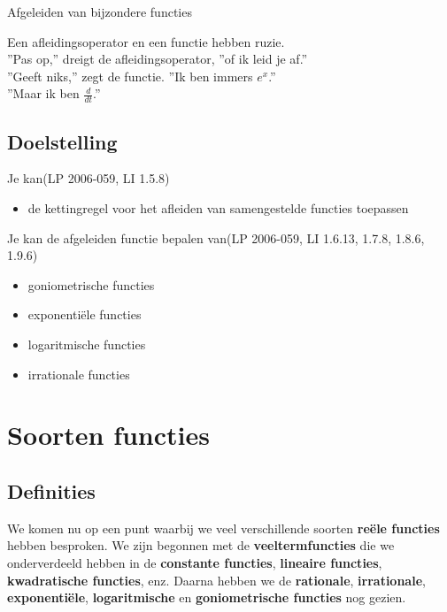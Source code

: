 \documentclass[12pt,twoside,a4paper]{article}
\begin{document}
\thispagestyle{empty}
\begin{center}
  \begin{mdframed}
  \centering
  \fontsize{40}{40}\selectfont Afgeleiden van bijzondere functies
  \end{mdframed}
  \vfill
  \begin{center}
    \begin{minipage}{0.3\textwidth}
    Een afleidingsoperator en een functie hebben ruzie.\\
    ''Pas op,'' dreigt de afleidingsoperator, ''of ik leid je af.''\\
    ''Geeft niks,'' zegt de functie. ''Ik ben immers $e^x$.''\\
    ''Maar ik ben $\frac{d}{dt}$.''
    \end{minipage}
  \end{center}
  \vfill
\end{center}
\subsection*{Doelstelling}
Je kan\hfill  {\scriptsize(LP 2006-059, LI 1.5.8)}
\begin{itemize}
  \item de kettingregel voor het afleiden van samengestelde functies toepassen
\end{itemize}
Je kan de afgeleiden functie bepalen van\hfill  {\scriptsize(LP 2006-059, LI 1.6.13, 1.7.8, 1.8.6, 1.9.6)}
\begin{itemize}
  \item goniometrische functies
  \item exponentiële functies
  \item logaritmische functies
  \item irrationale functies
\end{itemize}

\thispagestyle{empty}
\newpage

\thispagestyle{empty}
\tableofcontents
\newpage


\pagestyle{fancy}
\fancyhead[RE,LO]{}

\cleardoublepage
\section{Soorten functies}

\subsection{Definities}
We komen nu op een punt waarbij we veel verschillende soorten {\bf reële functies} hebben besproken. We zijn begonnen met de {\bf veeltermfuncties} die we onderverdeeld hebben in de {\bf constante functies}, {\bf lineaire functies}, {\bf kwadratische functies}, enz. Daarna hebben we de {\bf rationale}, {\bf irrationale}, {\bf exponentiële}, {\bf logaritmische} en {\bf goniometrische functies} nog gezien.
\end{document}
